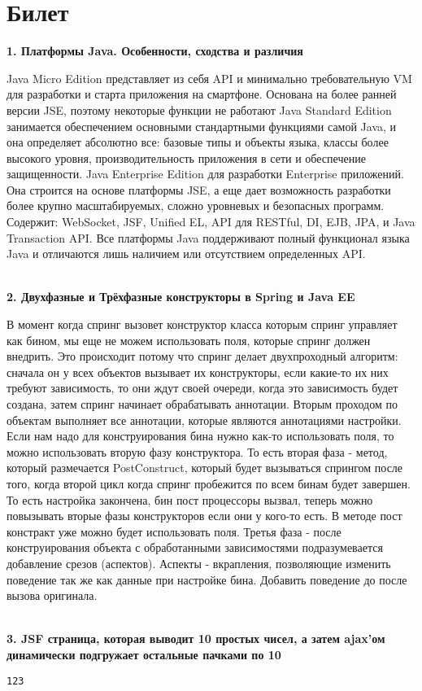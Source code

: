 \documentclass{article}
\newcommand{\bil}[5]{%
        \section{Билет}
        \textbf{1. #1}

        #4
        \\
        \textbf{2. #2}
        
        #5
        \\
        \textbf{3. #3}
}
\begin{document}
\bil{Платформы Java. Особенности, сходства и различия}
{Двухфазные и Трёхфазные конструкторы в Spring и Java EE}
{JSF страница, которая выводит 10 простых чисел, а затем ajax'ом динамически подгружает остальные пачками по 10}{
    Java Micro Edition представляет из себя API и минимально требовательную VM для разработки и старта приложения на смартфоне. Основана на более ранней версии JSE, поэтому некоторые функции не работают
    Java Standard Edition занимается обеспечением основными стандартными функциями самой Java, и она определяет абсолютно все: базовые типы и объекты языка, классы более высокого уровня, производительность приложения в сети и обеспечение защищенности.
    Java Enterprise Edition для разработки Enterprise приложений. Она строится на основе платформы JSE, а еще дает возможность разработки более крупно масштабируемых, сложно уровневых и безопасных программ. Содержит: WebSocket, JSF, Unified EL, API для RESTful, DI, EJB, JPA, и Java Transaction API.
    Все платформы Java поддерживают полный функционал языка Java и отличаются лишь наличием или отсутствием определенных API.
}{
    В момент когда спринг вызовет конструктор класса которым спринг управляет как бином, мы еще не можем использовать поля, которые спринг должен внедрить. Это происходит потому что спринг делает двухпроходный алгоритм: сначала он у всех объектов вызывает их конструкторы, если какие-то их них требуют зависимость, то они ждут своей очереди, когда это зависимость будет создана, затем спринг начинает обрабатывать аннотации. 
    Вторым проходом по объектам выполняет все аннотации, которые являются аннотациями настройки. Если нам надо для конструирования бина нужно как-то использовать поля, то можно использовать вторую фазу конструктора. 
    То есть вторая фаза - метод, который размечается PostConstruct, который будет вызываться спрингом после того, когда второй цикл когда спринг пробежится по всем бинам будет завершен. То есть настройка закончена, бин пост процессоры вызвал, теперь можно повызывать вторые фазы конструкторов если они у кого-то есть. В методе пост констракт уже можно будет использовать поля. 
    Третья фаза - после конструирования объекта с обработанными зависимостями подразумевается добавление срезов (аспектов). Аспекты - вкрапления, позволяющие изменить поведение так же как данные при настройке бина. Добавить поведение до после вызова оригинала.
}
\begin{lstlisting}[frame=single, basicstyle=\ttfamily, breaklines=true, breakatwhitespace=true, postbreak=\mbox{\textcolor{red}{$\hookrightarrow$}\space}]
123
\end{lstlisting}
\end{document}
